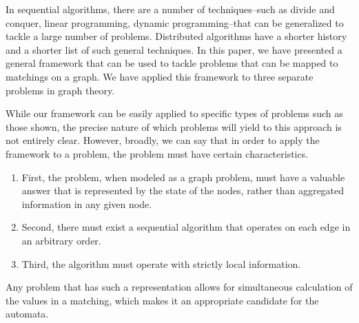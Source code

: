 In sequential algorithms, there are a number of techniques--such as divide and conquer, linear programming, dynamic programming--that can be generalized to tackle a large number of problems. Distributed algorithms have a shorter history and a shorter list of such general techniques. In this paper, we have presented a general framework that can be used to tackle problems that can be mapped to matchings on a graph. We have applied this framework to three separate problems in graph theory.

While our framework can be easily applied to specific types of problems such as those shown, the precise nature of which problems will yield to this approach is not entirely clear. However, broadly, we can say that in order to apply the framework to a problem, the problem must have certain characteristics.
\begin{enumerate}
\item First, the problem, when modeled as a graph problem, must have a valuable answer that is represented by the state of the nodes, rather than aggregated information in any given node.
\item Second, there must exist a sequential algorithm that operates on each edge in an arbitrary order. 
\item Third, the algorithm must operate with strictly local information.
\end{enumerate}
Any problem that has such a representation allows for simultaneous calculation of the values in a matching, which makes it an appropriate candidate for the automata.
